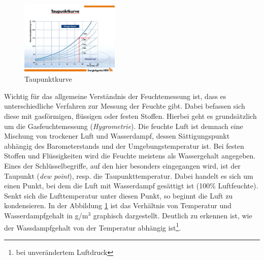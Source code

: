 \begin{center}
\begin{minipage}[h]{0.9\linewidth}
\begin{figure}
\includegraphics[width=0.42\textwidth]{graphics/Taupunktkurve.jpg}
\caption{Taupunktkurve \cite{PfefferkeineAngaben}}
\label{taupunktkurve}
\end{figure}

\vspace{3pt}

Wichtig für das allgemeine Verständnis der Feuchtemessung ist, dass es unterschiedliche Verfahren zur Messung der Feuchte gibt. Dabei befassen sich diese mit gasförmigen, flüssigen oder festen Stoffen. Hierbei geht es grundsätzlich um die Gasfeuchtemessung (\textit{Hygrometrie}). Die feuchte Luft ist demnach eine Mischung von trockener Luft und Wasserdampf, dessen Sättigungspunkt abhängig des Barometerstands und der Umgebungstemperatur ist. Bei festen Stoffen und Flüssigkeiten wird die Feuchte meistens als Wassergehalt angegeben. \cite{Hesse2014}\\[0.5cm]
Eines der Schlüsselbegriffe, auf den hier besonders eingegangen wird, ist der Taupunkt (\textit{dew point}), resp. die Taupunkttemperatur. Dabei handelt es sich um einen Punkt, bei dem die Luft mit Wasserdampf gesättigt ist (100\% Luftfeuchte). Senkt sich die Lufttemperatur unter diesen Punkt, so beginnt die Luft zu kondensieren. In der Abbildung \ref{taupunktkurve} ist das Verhältnis von Temperatur und Wasserdampfgehalt in g/m$^{3}$ graphisch dargestellt. Deutlich zu erkennen ist, wie der Wassdampfgehalt von der Temperatur abhängig ist\footnote{bei unverändertem Luftdruck}. \cite{Hesse2014}\\

\end{minipage}
\end{center}